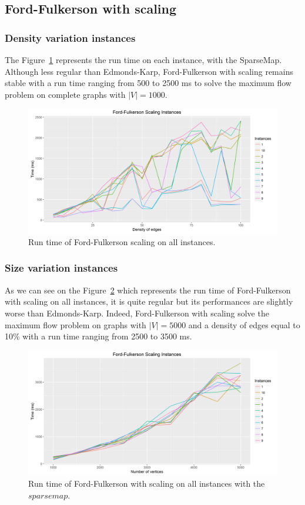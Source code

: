 \subsection{Ford-Fulkerson with scaling}
\subsubsection{Density variation instances}
The Figure~\ref{fig:FFmean} represents the run time on each instance, with the SparseMap. Although less regular than Edmonds-Karp, Ford-Fulkerson with scaling remains stable with a run time ranging from 500 to 2500 ms to solve the maximum flow problem on complete graphs with $|V|=1000$.
\begin{figure}[H]
\begin{center}
\includegraphics[scale=0.5]{images/FFmean.png}
\caption{Run time of Ford-Fulkerson scaling on all instances.}
\label{fig:FFmean}
\end{center}
\end{figure}
\subsubsection{Size variation instances}
As we can see on the Figure~\ref{fig:FFmeansize} which represents the run time of Ford-Fulkerson with scaling on all instances, it is quite regular but its performances are slightly worse than Edmonds-Karp. Indeed, Ford-Fulkerson with scaling solve the maximum flow problem on graphs with $|V|=5000$ and a density of edges equal to 10\% with a run time ranging from 2500 to 3500 ms.
\begin{figure}[H]
\begin{center}
\includegraphics[scale=0.5]{images/FFmeansize.png}
\caption{Run time of Ford-Fulkerson with scaling on all instances with the $sparse map$.}
\label{fig:FFmeansize}
\end{center}
\end{figure}
